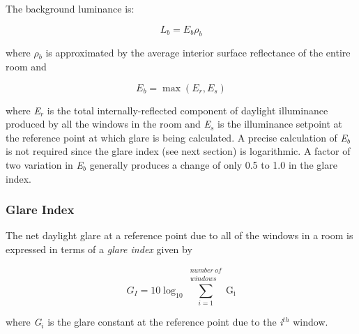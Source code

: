 The background luminance is:

\begin{equation}
{L_b} = {E_b}{\rho_b}
\end{equation}

where \emph{$\rho$\(_{b}\)} is approximated by the average interior surface reflectance of the entire room and

\begin{equation}
{E_b} = \max ({E_r},{E_s})
\end{equation}

where \emph{E\(_{r}\)} is the total internally-reflected component of daylight illuminance produced by all the windows in the room and \emph{E\(_{s}\)} is the illuminance setpoint at the reference point at which glare is being calculated. A precise calculation of \emph{E\(_{b}\)} is not required since the glare index (see next section) is logarithmic. A factor of two variation in \emph{E\(_{b}\)} generally produces a change of only 0.5 to 1.0 in the glare index.

\subsubsection{Glare Index}\label{glare-index}

The net daylight glare at a reference point due to all of the windows in a room is expressed in terms of a \emph{glare index} given by

\begin{equation}
{G_I} = 10{\log_{10}}\sum\limits_{i = 1}^{\scriptstyle \substack{number~of \\ windows}} {{{\mathrm{G}}_{\mathrm{i}}}}
\end{equation}

where \emph{G\(_{i}\)} is the glare constant at the reference point due to the \emph{i\(^{th}\)} window.
